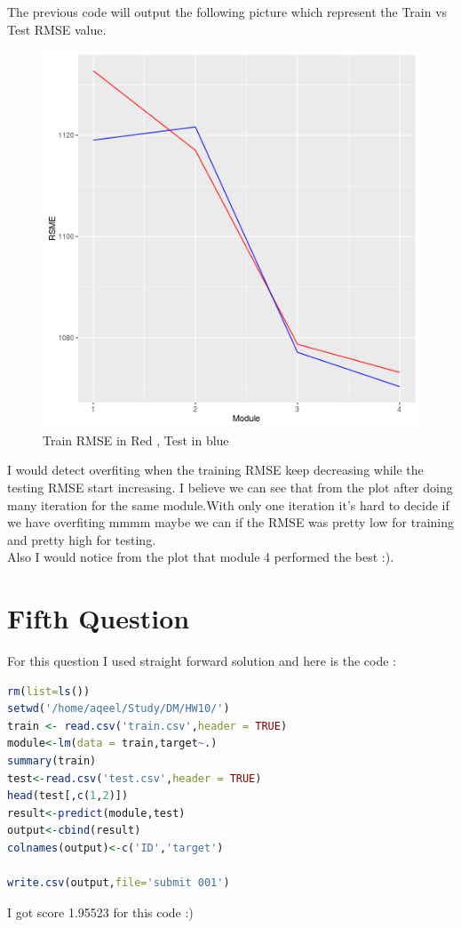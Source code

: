 \documentclass{article}
\begin{document}
The previous code will output the following picture which represent the Train vs Test RMSE value.
\begin{figure}[H]
\includegraphics[scale=1]{train_test.png}
\caption{Train RMSE in Red , Test in blue}
\end{figure}
I would detect overfiting when the training RMSE keep decreasing while the testing RMSE start increasing. I believe we can see that from the plot after doing many iteration for the same module.With only one iteration it's hard to decide if we have overfiting mmmm maybe we can if the RMSE was pretty low for training and pretty high for testing.\\
Also I would notice from the plot that module 4 performed the best :).
\section*{Fifth Question}
For this question I used straight forward solution and here is the code :
\begin{lstlisting}[language=R]
rm(list=ls())
setwd('/home/aqeel/Study/DM/HW10/')
train <- read.csv('train.csv',header = TRUE)
module<-lm(data = train,target~.)
summary(train)
test<-read.csv('test.csv',header = TRUE)
head(test[,c(1,2)])
result<-predict(module,test)
output<-cbind(result)
colnames(output)<-c('ID','target')

write.csv(output,file='submit 001')
\end{lstlisting}
I got  	score 1.95523 for this code :) 
\end{document}
